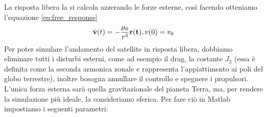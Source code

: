 La risposta libera la si calcola azzerando le forze esterne, così facendo
otteniamo l'equazione \ref{eq:free_response}
\begin{equation}
\dot{\bf v}(t)=-\frac{\mu_0}{r^3}{\bf r(t)}, v(0)=v_0 \nonumber
\end{equation}
Per poter simulare l'andamento del satellite in risposta libera, dobbiamo
eliminare tutti i disturbi esterni, come ad esempio il drag, la costante $J_2$
(essa è definita come la seconda armonica zonale e rappresenta l'appiattimento
ai poli del globo terrestre), inoltre bosogna annullare il controllo e spegnere
i propulsori. L'unica forza esterna sarà quella gravitazionale del pianeta
Terra, ma, per rendere la simulazione più ideale, la consideriamo sferica. Per
fare ciò in Matlab impostiamo i seguenti parametri:
